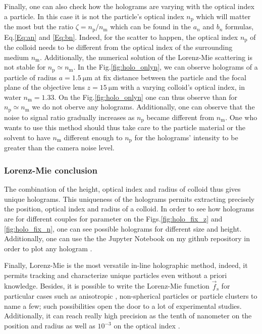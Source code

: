 Finally, one can also check how the holograms are varying with the optical index a particle. In this case it is not the particle's optical index $n_\mathrm{p}$ which will matter the most but the ratio $\zeta = n_\mathrm{p} / n_\mathrm{m} $ which can be found in the $a_n$ and $b_n$ formulas, Eq.\ref{Eq:an} and \ref{Eq:bn}. Indeed, for the scatter to happen, the optical index $n_\mathrm{p}$ of the colloid needs to be different from the optical index of the surrounding medium $n_\mathrm{m}$. Additionally, the numerical solution of the Lorenz-Mie scattering is not stable for $n_\mathrm{p} \simeq n_\mathrm{m}$. In the Fig.\ref{fig:holo_onlyn}, we can observe holograms of a particle of radius $a = 1.5 ~ \mathrm{\mu m}$ at fix distance between the particle and the focal plane of the objective lens $z=15 ~ \mathrm{\mu m}$ with a varying colloid's optical index, in water $n_\mathrm{m} = 1.33$. On the Fig.\ref{fig:holo_onlyn} one can thus observe than for  $n_\mathrm{p} \simeq n_\mathrm{m}$ we do not oberve any holograms.  Additionally, one can observe that the noise to signal ratio gradually increases as $n_\mathrm{p}$ became different from $n_\mathrm{m}$. One who wants to use this method should thus take care to the particle material or the solvent to have $n_\mathrm{m}$ different enough to  $n_\mathrm{p}$ for the holograms' intensity to be greater than the camera noise level.






\subsubsection{Lorenz-Mie conclusion}

The combination of the height, optical index and radius of colloid thus gives unique holograms. This uniqueness of the holograms permits extracting precisely the position, optical index and radius of a colloid. In order to see how holograms are for different couples for parameter on the Figs.\ref{fig:holo_fix_z} and \ref{fig:holo_fix_n}, one can see possible holograms for different size and height. Additionally, one can use the the Jupyter Notebook on my github repository in order to plot any hologram \href{https://github.com/eXpensia/Ma-these/blob/main/02_body/chapter2/images/holo_size_exemple/holosize_variation.ipynb}{\faGithub}.  

Finally, Lorenz-Mie is the most versatile in-line holographic method, indeed, it permits tracking and characterize unique particles even without a priori knowledge. Besides, it is possible to write the Lorenz-Mie function $\vec{f}_\mathrm{s}$ for particular cases such as anisotropic \cite{fung_holographic_2013}, non-spherical particles \cite{wang_using_2014} or particle clusters \cite{fung_holographic_2013, perry_real-space_2013} to name a few; such possibilities open the door to a lot of experimental studies. Additionally, it can reach really high precision as the tenth of nanometer on the position and radius as well as $10^{-3}$ on the optical index \cite{lee_characterizing_2007}. 

